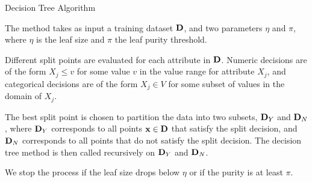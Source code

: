 \begin{frame}{Decision Tree Algorithm}

The method takes as input a training
dataset $\mathbf{D}$, and two parameters $\eta$ and $\pi$, where $\eta$
is the leaf size and $\pi$ the leaf purity threshold. 

\medskip
Different
split points are evaluated for each attribute in $\mathbf{D}$. Numeric
decisions are of the form $X_{j} \le v$ for some value $v$ in the value range for attribute $X_{j}$, and categorical decisions are of the
form $X_{j} \in V$ for some subset of values in the domain of $X_{j}$.

\medskip
The best split point is chosen to partition the data into two
subsets, $\mathbf{D}_Y$ and $\mathbf{D}_N$, where $\mathbf{D}_Y$ corresponds to all
points $\mathbf{x} \in \mathbf{D}$ that satisfy the split decision, and $\mathbf{D}_N$
corresponds to all points that do not satisfy the split decision.
The decision tree method is then called recursively on $\mathbf{D}_Y$ and
$\mathbf{D}_N$. 

\medskip
We stop the process if the leaf size drops below $\eta$ or if the purity
is at least $\pi$.
\end{frame}




